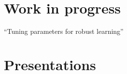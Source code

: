 \documentclass[10pt]{article}
\begin{document}
	\section*{Work in progress}
	\vspace{-0.5em}
	
	\hspace{1em}``Tuning parameters for robust learning''
	
	\smallskip 
	
	
	

	
	
	
	\smallskip

	
	
%	
%	
%	
	
	\section*{Presentations}
	\vspace{-2.5em}
	
\end{document}
